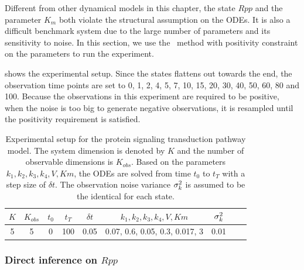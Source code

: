 Different from other dynamical models in this chapter, the state $Rpp$ and the parameter $K_m$ both violate the structural assumption on the ODEs.
It is also a difficult benchmark system due to the large number of parameters and its sensitivity to noise.
In this section, we use the \algolpmf\ method with positivity constraint on the parameters to run the experiment.

 shows the experimental setup. 
Since the states flattens out towards the end, the observation time points are set to 0, 1, 2, 4, 5, 7, 10, 15, 20, 30, 40, 50, 60, 80 and 100.
Because the observations in this experiment are required to be positive, when the noise is too big to generate negative observations, it is resampled until the positivity requirement is satisfied.

\begin{table}
\centering
\caption{Experimental setup for the protein signaling transduction pathway model. The system dimension is denoted by $K$ and the number of observable dimensions is $K_{obs}$. Based on the parameters $k_1, k_2, k_3, k_4, V, Km$, the ODEs are solved from time $t_0$ to $t_T$ with a step size of $\delta t$. The observation noise variance $\sigma_{k}^2$ is assumed to be the identical for each state.}
\label{table-protein-setup}
\begin{tabular}{|c|c|c|c|c|c|c|c|c|}
\hline
$K$ & $K_{obs}$ & $t_0$ & $t_T$ & $\delta t$ & $k_1, k_2, k_3, k_4, V, Km$ & $\sigma_{k}^2$ \\ \hline
5 & 5 & 0 & 100 & 0.05 & 0.07, 0.6, 0.05, 0.3, 0.017, 3 & 0.01\\ \hline
\end{tabular}
\end{table}

\subsubsection*{Direct inference on $Rpp$}

